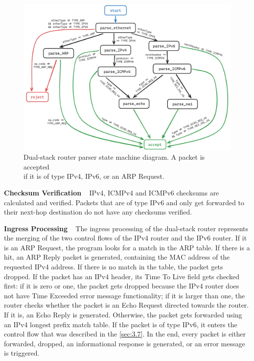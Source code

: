 \begin{figure}[htbp]
  \centering
    \includegraphics[width=1\textwidth]{figures/implementation/dualstack_parser.jpg}
     \caption{Dual-stack router parser state machine diagram. A packet is accepted \\ if it is of type IPv4, IPv6, or an ARP Request.}
     \label{fig:impl-dualparser}
\end{figure}

\textbf{Checksum Verification} ~ IPv4, ICMPv4 and ICMPv6 checksums are calculated and verified. Packets that are of type IPv6 and only get forwarded to their next-hop destination do not have any checksums verified.

\textbf{Ingress Processing} ~ The ingress processing of the dual-stack router represents the merging of the two control flows of the IPv4 router and the IPv6 router. If it is an ARP Request, the program looks for a match in the ARP table. If there is a hit, an ARP Reply packet is generated, containing the MAC address of the requested IPv4 address. If there is no match in the table, the packet gets dropped. If the packet has an IPv4 header, its Time To Live field gets checked first: if it is zero or one, the packet gets dropped because the IPv4 router does not have Time Exceeded error message functionality; if it is larger than one, the router checks whether the packet is an Echo Request directed towards the router. If it is, an Echo Reply is generated. Otherwise, the packet gets forwarded using an IPv4 longest prefix match table. If the packet is of type IPv6, it enters the control flow that was described in the \cref{sec:3.7}. In the end, every packet is either forwarded, dropped, an informational response is generated, or an error message is triggered. 

